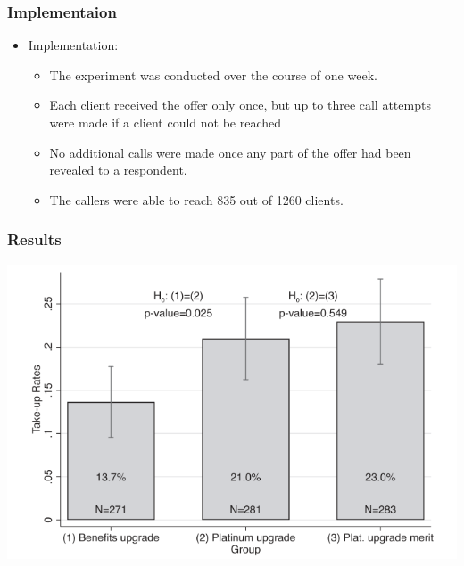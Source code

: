 \documentclass[unicode,12pt]{beamer}
\begin{document}
    \begin{frame}
        \frametitle{Implementaion}
    
        \begin{itemize}
            \item Implementation: 
            \begin{itemize}
                \item The experiment was conducted over the course of one week.
                \item Each client received the offer only once, but up to three call attempts were made if a client could not be reached
                \item No additional calls were made once any part of the offer had been revealed to a respondent.
                \item The callers were able to reach 835 out of 1260 clients.
            \end{itemize}
        \end{itemize}
    
    \end{frame}

    \begin{frame}
        \frametitle{Results}
    
        \centerline{\includegraphics[width = \linewidth]{0717kato/result_exp1.PNG}}
    
    \end{frame}
\end{document}
